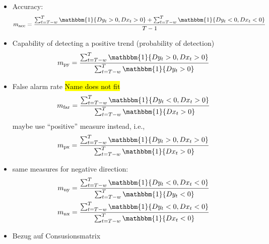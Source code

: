 \documentclass[oneside]{article}
\theoremstyle{plain}%
\theoremstyle{definition}
\newcommand{\ind}[1]{\mathbbm{1}\{#1\}}
\newcommand{\ydiff}{D y}
\newcommand{\xdiff}{Dx}
\begin{document}

\begin{itemize}
  \item Accuracy: \begin{equation}
  	m_{\text{acc}} = \frac{\sum_{t=T-w}^T \ind{\ydiff_t > 0, \xdiff_t > 0} + \sum_{t=T-w}^T \ind{\ydiff_t < 0, \xdiff_t < 0}}{T-1}
\end{equation}
	\item Capability of detecting a positive trend (probability of detection)
	\begin{equation}
  		m_{\text{py}} = \frac{\sum_{t=T-w}^T \ind{\ydiff_t > 0, \xdiff_t > 0}}{\sum_{t=T-w}^T \ind{\ydiff_t > 0}}
	\end{equation}
	\item False alarm rate \hl{Name does not fit} \begin{equation}
  m_{\text{far}} = \frac{\sum_{t=T-w}^T \ind{\ydiff_t < 0, \xdiff_t > 0}}{\sum_{t=T-w}^T \ind{\xdiff_t > 0}}
\end{equation}
maybe use \enquote{positive} measure instead, i.e.,
\begin{equation}
  m_{\text{px}} = \frac{\sum_{t=T-w}^T \ind{\ydiff_t > 0, \xdiff_t > 0}}{\sum_{t=T-w}^T \ind{\xdiff_t > 0}}  
\end{equation}
	\item same measures for negative direction:
	\begin{align}
		m_{\text{ny}} &=  \frac{\sum_{t=T-w}^T \ind{\ydiff_t < 0, \xdiff_t < 0}}{\sum_{t=T-w}^T \ind{\ydiff_t < 0}} \\
		m_{\text{nx}} &=  \frac{\sum_{t=T-w}^T \ind{\ydiff_t < 0, \xdiff_t < 0}}{\sum_{t=T-w}^T \ind{\xdiff_t < 0}}
	\end{align}
 \item Bezug auf Consusionsmatrix 
\end{itemize}
\end{document}
